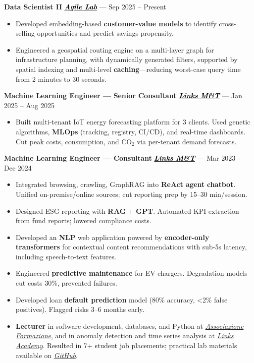 \documentclass[11pt,a4paper]{article}
\let\OldHref\href
\renewcommand{\href}[2]{\OldHref{#1}{\textit{#2}}}
\begin{document}
    {\small
        \textbf{Data Scientist II} \hfill \href{https://www.agilelab.it/}{\textbf{\textcolor{black}{Agile Lab}}} — Sep 2025 -- Present
        \begin{itemize}
            \item Developed embedding-based \textbf{customer-value models} to identify cross-selling opportunities and predict savings propensity.
            \item Engineered a geospatial routing engine on a multi-layer graph for infrastructure planning, with dynamically generated filters, supported by spatial indexing and multi-level \textbf{caching}—reducing worst-case query time from 2 minutes to 30 seconds.
        \end{itemize}
        \textbf{Machine Learning Engineer — Senior Consultant} \hfill \href{https://www.linksmt.it/}{\textbf{\textcolor{black}{Links M\&T}}} — Jan 2025 -- Aug 2025
        \begin{itemize}
            \item Built multi-tenant IoT energy forecasting platform for 3 clients. Used genetic algorithms, \textbf{MLOps} (tracking, registry, CI/CD), and real-time dashboards. Cut peak costs, consumption, and CO$_2$ via per-tenant demand forecasts.
        \end{itemize}
        
        \textbf{Machine Learning Engineer — Consultant} \hfill \href{https://www.linksmt.it/}{\textbf{\textcolor{black}{Links M\&T}}} — Mar 2023 -- Dec 2024
        \begin{itemize}
            \item Integrated browsing, crawling, GraphRAG into \textbf{ReAct agent} \textbf{chatbot}. Unified on-premise/online sources; cut reporting prep by 15--30 min/session.
			\item Designed ESG reporting with \textbf{RAG} + \textbf{GPT}. Automated KPI extraction from fund reports; lowered compliance costs.
			\item Developed an \textbf{NLP} web application powered by \textbf{encoder-only transformers} for contextual content recommendations with sub-5s latency, including speech-to-text features.
            \item Engineered \textbf{predictive maintenance} for EV chargers. Degradation models cut costs 30\%, prevented failures.
			\item Developed loan \textbf{default prediction} model (80\% accuracy, <2\% false positives). Flagged risks 3--6 months early.
            \item \textbf{Lecturer} in software development, databases, and Python at \href{https://www.associazioneformazione.it/formazione-professionale/ifts-tecnico-per-la-progettazione-e-lo-sviluppo-di-applicazioni-informatiche}{Associazione Formazione}, and in anomaly detection and time series analysis at \href{https://academy.linksmt.it/corso-di-formazione-post-laurea-artificial-intelligence-machine-learning/}{Links Academy}. Resulted in 7+ student job placements; practical lab materials available on \href{https://github.com/francesco-s/Links-Academy---Anomaly-Detection-Time-series-analysis}{GitHub}.
        \end{itemize}
        
}
\end{document}
